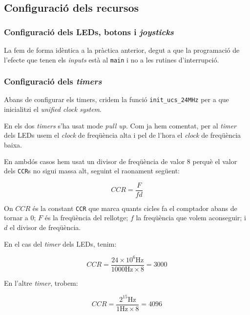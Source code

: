 \documentclass{../pdae} %
\begin{document}
\subsection{Configuració dels recursos}
\subsubsection{Configuració dels LEDs, botons i \textit{joysticks}}

La fem de forma idèntica a la pràctica anterior, degut a que la programació
de l'efecte que tenen els \textit{inputs} està al \texttt{main} i no
a les rutines d'interrupció.

\subsubsection{Configuració dels \textit{timers}}
Abans de configurar els timers, cridem la funció \texttt{init\_ucs\_24MHz} per
a que inicialitzi el \textit{unified clock system}.

En els dos \textit{timers} s'ha usat mode \textit{pull up}. Com ja hem comentat,
per al \textit{timer} dels LEDs usem el \textit{clock} de freqüència alta i
pel de l'hora el \textit{clock} de freqüència baixa.

En ambdós casos hem usat un divisor de freqüència de valor 8 perquè el valor
dels \texttt{CCR}s no sigui massa alt, seguint el raonament següent:

\begin{equation*}
  CCR = \frac{F}{fd}
\end{equation*}

On $CCR$ és la constant \texttt{CCR} que marca quants cicles fa el comptador
abans de tornar a 0; $F$ és la freqüència del rellotge; $f$ la freqüència que
volem aconseguir; i $d$ el divisor de freqüència.

En el cas del \textit{timer} dels LEDs, tenim:

\begin{equation*}
  CCR = \frac{24\times10^{6}\mathrm{Hz}}{1000\mathrm{Hz}\times 8} = 3000
\end{equation*}

En l'altre \textit{timer}, trobem:

\begin{equation*}
  CCR = \frac{2^{15}\mathrm{Hz}}{1\mathrm{Hz}\times 8} = 4096
\end{equation*}
\end{document}
